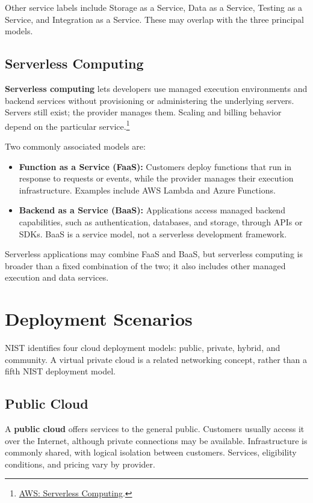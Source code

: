 Other service labels include Storage as a Service, Data as a Service, Testing as a Service, and Integration as a Service. These may overlap with the three principal models.

\subsection{Serverless Computing}
\textbf{Serverless computing} lets developers use managed execution environments and backend services without provisioning or administering the underlying servers. Servers still exist; the provider manages them. Scaling and billing behavior depend on the particular service.\footnote{\href{https://aws.amazon.com/serverless/}{AWS: Serverless Computing}.}

Two commonly associated models are:

\begin{itemize}
  \item \textbf{Function as a Service (FaaS):} Customers deploy functions that run in response to requests or events, while the provider manages their execution infrastructure. Examples include AWS Lambda and Azure Functions.
  \item \textbf{Backend as a Service (BaaS):} Applications access managed backend capabilities, such as authentication, databases, and storage, through APIs or SDKs. BaaS is a service model, not a serverless development framework.
\end{itemize}

Serverless applications may combine FaaS and BaaS, but serverless computing is broader than a fixed combination of the two; it also includes other managed execution and data services.

\section{Deployment Scenarios}
NIST identifies four cloud deployment models: public, private, hybrid, and community. A virtual private cloud is a related networking concept, rather than a fifth NIST deployment model.

\subsection{Public Cloud}
A \textbf{public cloud} offers services to the general public. Customers usually access it over the Internet, although private connections may be available. Infrastructure is commonly shared, with logical isolation between customers. Services, eligibility conditions, and pricing vary by provider.

